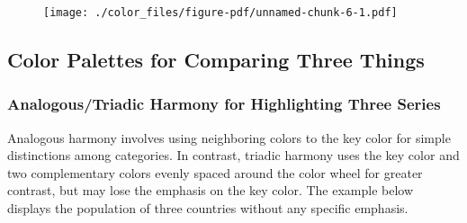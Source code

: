 \documentclass[
  letterpaper,
]{book}
\begin{document}
\begin{figure}[H]

{\centering \texttt{[image: ./color\_files/figure-pdf/unnamed-chunk-6-1.pdf]}

}

\end{figure}

\hypertarget{color-palettes-for-comparing-three-things}{%
\subsection{Color Palettes for Comparing Three
Things}\label{color-palettes-for-comparing-three-things}}

\hypertarget{analogoustriadic-harmony-for-highlighting-three-series}{%
\subsubsection{Analogous/Triadic Harmony for Highlighting Three
Series}\label{analogoustriadic-harmony-for-highlighting-three-series}}

Analogous harmony involves using neighboring colors to the key color for
simple distinctions among categories. In contrast, triadic harmony uses
the key color and two complementary colors evenly spaced around the
color wheel for greater contrast, but may lose the emphasis on the key
color. The example below displays the population of three countries
without any specific emphasis.
\end{document}
